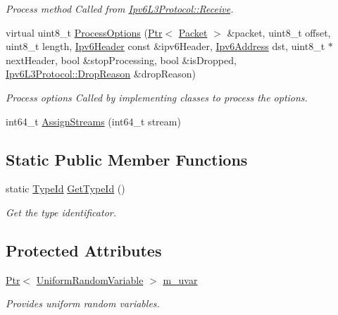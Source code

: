 \begin{DoxyCompactItemize}
\begin{DoxyCompactList}\small\item\em Process method Called from \hyperlink{classns3_1_1Ipv6L3Protocol_a8a95d576e8aee9a571db93bf686d850a}{Ipv6\+L3\+Protocol\+::\+Receive}. \end{DoxyCompactList}\item 
virtual uint8\+\_\+t \hyperlink{classns3_1_1Ipv6Extension_adb5bf5cc46ab4c1936c0641ad4fd7a07}{Process\+Options} (\hyperlink{classns3_1_1Ptr}{Ptr}$<$ \hyperlink{classns3_1_1Packet}{Packet} $>$ \&packet, uint8\+\_\+t offset, uint8\+\_\+t length, \hyperlink{classns3_1_1Ipv6Header}{Ipv6\+Header} const \&ipv6\+Header, \hyperlink{classns3_1_1Ipv6Address}{Ipv6\+Address} dst, uint8\+\_\+t $\ast$next\+Header, bool \&stop\+Processing, bool \&is\+Dropped, \hyperlink{classns3_1_1Ipv6L3Protocol_a33c64db9bc35f71ff368b132bfffa37a}{Ipv6\+L3\+Protocol\+::\+Drop\+Reason} \&drop\+Reason)
\begin{DoxyCompactList}\small\item\em Process options Called by implementing classes to process the options. \end{DoxyCompactList}\item 
int64\+\_\+t \hyperlink{classns3_1_1Ipv6Extension_a2c69eb5dc7b06c5e96acc888a625b43e}{Assign\+Streams} (int64\+\_\+t stream)
\end{DoxyCompactItemize}
\subsection*{Static Public Member Functions}
\begin{DoxyCompactItemize}
\item 
static \hyperlink{classns3_1_1TypeId}{Type\+Id} \hyperlink{classns3_1_1Ipv6Extension_af1f1bbcd0d8a894af73b13845524bfc7}{Get\+Type\+Id} ()
\begin{DoxyCompactList}\small\item\em Get the type identificator. \end{DoxyCompactList}\end{DoxyCompactItemize}
\subsection*{Protected Attributes}
\begin{DoxyCompactItemize}
\item 
\hyperlink{classns3_1_1Ptr}{Ptr}$<$ \hyperlink{classns3_1_1UniformRandomVariable}{Uniform\+Random\+Variable} $>$ \hyperlink{classns3_1_1Ipv6Extension_a785a3e81279962a9515646780b08e26a}{m\+\_\+uvar}
\begin{DoxyCompactList}\small\item\em Provides uniform random variables. \end{DoxyCompactList}\end{DoxyCompactItemize}
